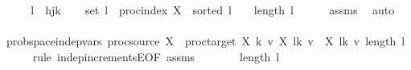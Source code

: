 \begin{isabellebody}
%
\isadelimproof
%
\endisadelimproof
%
\isatagproof
{}\isamarkupfalse%
\ {\isacharminus}{\kern0pt}\isanewline
\ \ \isamarkupfalse%
\ {\isacharquery}{\kern0pt}l\ {\isacharequal}{\kern0pt}\ {\isachardoublequoteopen}{\isacharbrackleft}{\kern0pt}h{\isacharcomma}{\kern0pt}j{\isacharcomma}{\kern0pt}k{\isacharbrackright}{\kern0pt}{\isachardoublequoteclose}\isanewline
\ \ \isamarkupfalse%
\ {\isachardoublequoteopen}set\ {\isacharquery}{\kern0pt}l\ {\isasymsubseteq}\ proc{\isacharunderscore}{\kern0pt}index\ X\ {\isasymand}\ sorted\ {\isacharquery}{\kern0pt}l\ {\isasymand}\ {}\ {\isasymle}\ length\ {\isacharquery}{\kern0pt}l{\isachardoublequoteclose}\isanewline
\ \ \ \ \isamarkupfalse%
\ assms\ \isamarkupfalse%
\ auto\isanewline
\ \ \isamarkupfalse%
\ \isamarkupfalse%
\ {\isachardoublequoteopen}prob{\isacharunderscore}{\kern0pt}space{\isachardot}{\kern0pt}indep{\isacharunderscore}{\kern0pt}vars\ {\isacharparenleft}{\kern0pt}proc{\isacharunderscore}{\kern0pt}source\ X{\isacharparenright}{\kern0pt}\ {\isacharparenleft}{\kern0pt}{\isasymlambda}{\isacharunderscore}{\kern0pt}{\isachardot}{\kern0pt}\ proc{\isacharunderscore}{\kern0pt}target\ X{\isacharparenright}{\kern0pt}\ {\isacharparenleft}{\kern0pt}{\isasymlambda}k\ v{\isachardot}{\kern0pt}\ X\ {\isacharparenleft}{\kern0pt}{\isacharquery}{\kern0pt}l{\isacharbang}{\kern0pt}k{\isacharparenright}{\kern0pt}\ v\ {\isacharminus}{\kern0pt}\ X\ {\isacharparenleft}{\kern0pt}{\isacharquery}{\kern0pt}l{\isacharbang}{\kern0pt}{\isacharparenleft}{\kern0pt}k{\isacharminus}{\kern0pt}{}{\isacharparenright}{\kern0pt}{\isacharparenright}{\kern0pt}\ v{\isacharparenright}{\kern0pt}\ {\isacharbraceleft}{\kern0pt}{}{\isachardot}{\kern0pt}{\isachardot}{\kern0pt}{\isacharless}{\kern0pt}length\ {\isacharquery}{\kern0pt}l{\isacharbraceright}{\kern0pt}{\isachardoublequoteclose}\isanewline
\ \ \ \ \isamarkupfalse%
\ {\isacharparenleft}{\kern0pt}rule\ indep{\isacharunderscore}{\kern0pt}incrementsE{\isacharbrackleft}{\kern0pt}OF\ assms{\isacharparenleft}{\kern0pt}{}{\isacharparenright}{\kern0pt}{\isacharbrackright}{\kern0pt}{\isacharparenright}{\kern0pt}\isanewline
\ \ \isamarkupfalse%
\ \isamarkupfalse%
\ {\isachardoublequoteopen}{}\ {\isasymin}\ {\isacharbraceleft}{\kern0pt}{}{\isachardot}{\kern0pt}{\isachardot}{\kern0pt}{\isacharless}{\kern0pt}length\ {\isacharquery}{\kern0pt}l{\isacharbraceright}{\kern0pt}{\isachardoublequoteclose}\isanewline

\end{isabellebody}
